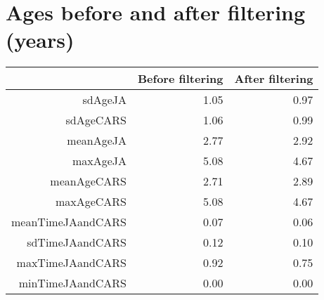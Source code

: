 \documentclass{article}
\begin{document}
\section{Ages before and after filtering (years)}

\begin{table}[ht]
\centering
\begin{tabular}{rrr}
  \hline
  & Before filtering & After filtering \\ 
  \hline
  sdAgeJA & 1.05 & 0.97 \\ 
  sdAgeCARS & 1.06 & 0.99 \\ 
  meanAgeJA & 2.77 & 2.92 \\ 
  maxAgeJA & 5.08 & 4.67 \\ 
  meanAgeCARS & 2.71 & 2.89 \\ 
  maxAgeCARS & 5.08 & 4.67 \\ 
  meanTimeJAandCARS & 0.07 & 0.06 \\ 
  sdTimeJAandCARS & 0.12 & 0.10 \\ 
  maxTimeJAandCARS & 0.92 & 0.75 \\ 
  minTimeJAandCARS & 0.00 & 0.00 \\ 
   \hline
\end{tabular}
\end{table}
\end{document}
